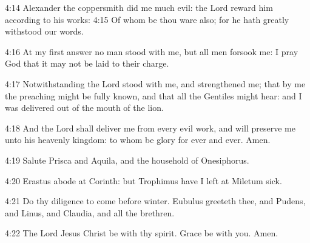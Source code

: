 4:14 Alexander the coppersmith did me much evil: the Lord reward him
according to his works: 4:15 Of whom be thou ware also; for he hath
greatly withstood our words.

4:16 At my first answer no man stood with me, but all men forsook me:
I pray God that it may not be laid to their charge.

4:17 Notwithstanding the Lord stood with me, and strengthened me; that
by me the preaching might be fully known, and that all the Gentiles
might hear: and I was delivered out of the mouth of the lion.

4:18 And the Lord shall deliver me from every evil work, and will
preserve me unto his heavenly kingdom: to whom be glory for ever and
ever. Amen.

4:19 Salute Prisca and Aquila, and the household of Onesiphorus.

4:20 Erastus abode at Corinth: but Trophimus have I left at Miletum
sick.

4:21 Do thy diligence to come before winter. Eubulus greeteth thee,
and Pudens, and Linus, and Claudia, and all the brethren.

4:22 The Lord Jesus Christ be with thy spirit. Grace be with you.
Amen.

